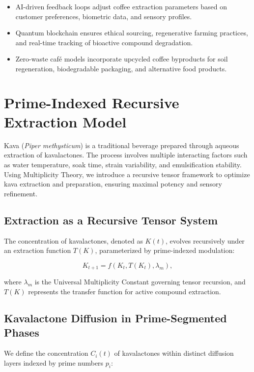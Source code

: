 \documentclass{article}
\theoremstyle{plain}
\theoremstyle{claimstyle}
\begin{document}
\begin{itemize}
    \item AI-driven feedback loops adjust coffee extraction parameters based on customer preferences, biometric data, and sensory profiles.
    \item Quantum blockchain ensures ethical sourcing, regenerative farming practices, and real-time tracking of bioactive compound degradation.
    \item Zero-waste café models incorporate upcycled coffee byproducts for soil regeneration, biodegradable packaging, and alternative food products.
\end{itemize}

\section{Prime-Indexed Recursive Extraction Model}

Kava (\textit{Piper methysticum}) is a traditional beverage prepared through aqueous extraction of kavalactones. The process involves multiple interacting factors such as water temperature, soak time, strain variability, and emulsification stability. Using Multiplicity Theory, we introduce a recursive tensor framework to optimize kava extraction and preparation, ensuring maximal potency and sensory refinement.

\subsection{Extraction as a Recursive Tensor System}
The concentration of kavalactones, denoted as \( K(t) \), evolves recursively under an extraction function \( T(K) \), parameterized by prime-indexed modulation:

\begin{equation}
    K_{t+1} = f(K_t, T(K_t), \lambda_m),
\end{equation}

where \( \lambda_m \) is the Universal Multiplicity Constant governing tensor recursion, and \( T(K) \) represents the transfer function for active compound extraction.

\subsection{Kavalactone Diffusion in Prime-Segmented Phases}
We define the concentration \( C_i(t) \) of kavalactones within distinct diffusion layers indexed by prime numbers \( p_i \):
\end{document}
